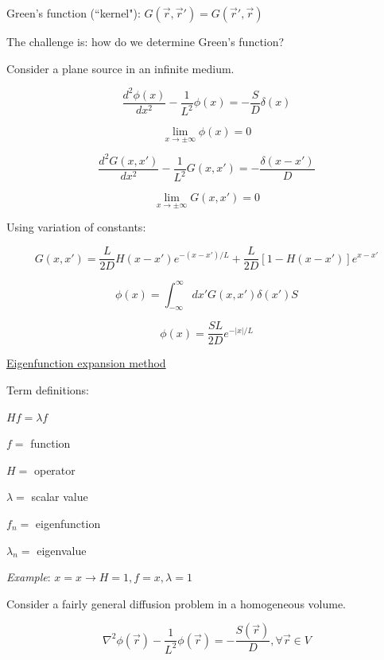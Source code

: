 \documentclass[12pt]{article}
\newcommand{\rvec}{\ensuremath{\vec{r}}}
\newcommand{\vecr}{\ensuremath{\vec{r}}}
\begin{document}
Green's function (``kernel"): $G(\rvec,\rvec') = G(\rvec',\rvec)$


The challenge is: how do we determine Green's function?


Consider a plane source in an infinite medium.

\begin{equation*}
\frac{d^2\phi(x)}{dx^2} - \frac{1}{L^2}\phi(x) = -\frac{S}{D}\delta(x)
\end{equation*}

\begin{equation*}
\lim\limits_{x\to\pm\infty}\phi(x) = 0
\end{equation*}

\begin{equation*}
\frac{d^2 G(x,x')}{dx^2} - \frac{1}{L^2}G(x,x') = -\frac{\delta(x-x')}{D}
\end{equation*}

\begin{equation*}
\lim\limits_{x\to\pm\infty}G(x,x') = 0
\end{equation*}

Using variation of constants:

\begin{equation*}
G(x,x') = \frac{L}{2D}H(x-x')e^{-(x-x')/L} + \frac{L}{2D}[1-H(x-x')]e^{x-x'}
\end{equation*}

\begin{equation*}
\phi(x) = \int_{-\infty}^{\infty}dx'G(x,x')\delta(x')S
\end{equation*}

\begin{equation*}
\phi(x) = \frac{SL}{2D}e^{-|x|/L}
\end{equation*}

\underline{Eigenfunction expansion method}

Term definitions:

$Hf = \lambda f$

$f =$ function

$H =$ operator

$\lambda =$ scalar value

$f_n =$ eigenfunction

$\lambda_n =$ eigenvalue


\emph{Example}: $x = x \rightarrow H = 1, f = x, \lambda = 1$ 

Consider a fairly general diffusion problem in a homogeneous volume.

\begin{equation*}
\nabla^2\phi(\vecr) - \frac{1}{L^2}\phi(\vecr) = -\frac{S(\rvec)}{D}, \forall \rvec \in V
\end{equation*}
\end{document}
